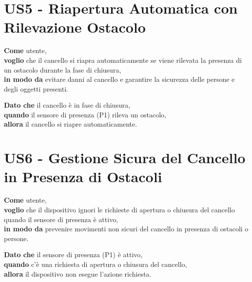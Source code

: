 \section{US5 - Riapertura Automatica con Rilevazione Ostacolo}
\begin{tcolorbox}[title={Descrizione}, colback=red!20!white, colframe=red!80!black]
    \textbf{Come} utente, \\
    \textbf{voglio} che il cancello si riapra automaticamente se viene rilevata la presenza di un ostacolo durante la fase di chiusura, \\
    \textbf{in modo da} evitare danni al cancello e garantire la sicurezza delle persone e degli oggetti presenti.
\end{tcolorbox}

\begin{tcolorbox}[title={Criterio di Accettazione}, colback=blue!20!white, colframe=blue!80!black]
    \textbf{Dato che} il cancello è in fase di chiusura, \\
    \textbf{quando} il sensore di presenza (P1) rileva un ostacolo, \\
    \textbf{allora} il cancello si riapre automaticamente.
\end{tcolorbox}

\section{US6 - Gestione Sicura del Cancello in Presenza di Ostacoli}
\begin{tcolorbox}[title={Descrizione}, colback=red!20!white, colframe=red!80!black]
    \textbf{Come} utente, \\
    \textbf{voglio} che il dispositivo ignori le richieste di apertura o chiusura del cancello quando il sensore di presenza è attivo, \\
    \textbf{in modo da} prevenire movimenti non sicuri del cancello in presenza di ostacoli o persone.
\end{tcolorbox}

\begin{tcolorbox}[title={Criterio di Accettazione \#1}, colback=blue!20!white, colframe=blue!80!black]
    \textbf{Dato che} il sensore di presenza (P1) è attivo, \\
    \textbf{quando} c'è una richiesta di apertura o chiusura del cancello, \\
    \textbf{allora} il dispositivo non esegue l'azione richiesta.
\end{tcolorbox}

